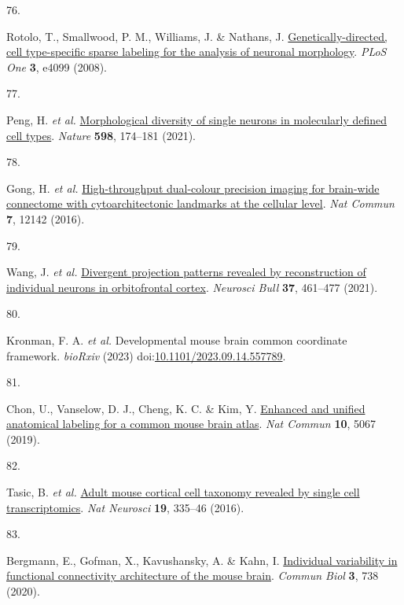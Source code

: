 \documentclass[
  12pt,
]{article}
\newlength{\cslhangindent}
\newlength{\csllabelwidth}
\newenvironment{CSLReferences}[2] %
 {\begin{list}{}{%
  \setlength{\itemindent}{0pt}
  \setlength{\leftmargin}{0pt}
  \setlength{\parsep}{0pt}
  \ifodd #1
   \setlength{\leftmargin}{\cslhangindent}
   \setlength{\itemindent}{-1\cslhangindent}
  \fi
  \setlength{\itemsep}{#2\baselineskip}}}
 {\end{list}}
\newcommand{\CSLLeftMargin}[1]{\parbox[t]{\csllabelwidth}{\strut#1\strut}}
\newcommand{\CSLRightInline}[1]{\parbox[t]{\linewidth - \csllabelwidth}{\strut#1\strut}}
\begin{document}
\begin{CSLReferences}{0}{0}
\CSLLeftMargin{76. }%
\CSLRightInline{Rotolo, T., Smallwood, P. M., Williams, J. \& Nathans,
J.
\href{https://doi.org/10.1371/journal.pone.0004099}{Genetically-directed,
cell type-specific sparse labeling for the analysis of neuronal
morphology}. \emph{PLoS One} \textbf{3}, e4099 (2008).}

\CSLLeftMargin{77. }%
\CSLRightInline{Peng, H. \emph{et al.}
\href{https://doi.org/10.1038/s41586-021-03941-1}{Morphological
diversity of single neurons in molecularly defined cell types}.
\emph{Nature} \textbf{598}, 174--181 (2021).}

\CSLLeftMargin{78. }%
\CSLRightInline{Gong, H. \emph{et al.}
\href{https://doi.org/10.1038/ncomms12142}{High-throughput dual-colour
precision imaging for brain-wide connectome with cytoarchitectonic
landmarks at the cellular level}. \emph{Nat Commun} \textbf{7}, 12142
(2016).}

\CSLLeftMargin{79. }%
\CSLRightInline{Wang, J. \emph{et al.}
\href{https://doi.org/10.1007/s12264-020-00616-1}{Divergent projection
patterns revealed by reconstruction of individual neurons in
orbitofrontal cortex}. \emph{Neurosci Bull} \textbf{37}, 461--477
(2021).}

\CSLLeftMargin{80. }%
\CSLRightInline{Kronman, F. A. \emph{et al.} Developmental mouse brain
common coordinate framework. \emph{bioRxiv} (2023)
doi:\href{https://doi.org/10.1101/2023.09.14.557789}{10.1101/2023.09.14.557789}.}

\CSLLeftMargin{81. }%
\CSLRightInline{Chon, U., Vanselow, D. J., Cheng, K. C. \& Kim, Y.
\href{https://doi.org/10.1038/s41467-019-13057-w}{Enhanced and unified
anatomical labeling for a common mouse brain atlas}. \emph{Nat Commun}
\textbf{10}, 5067 (2019).}

\CSLLeftMargin{82. }%
\CSLRightInline{Tasic, B. \emph{et al.}
\href{https://doi.org/10.1038/nn.4216}{Adult mouse cortical cell
taxonomy revealed by single cell transcriptomics}. \emph{Nat Neurosci}
\textbf{19}, 335--46 (2016).}

\CSLLeftMargin{83. }%
\CSLRightInline{Bergmann, E., Gofman, X., Kavushansky, A. \& Kahn, I.
\href{https://doi.org/10.1038/s42003-020-01472-5}{Individual variability
in functional connectivity architecture of the mouse brain}.
\emph{Commun Biol} \textbf{3}, 738 (2020).}


\end{CSLReferences}
\end{document}
